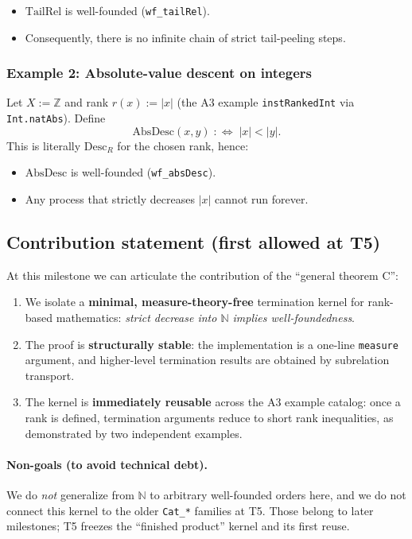 \begin{itemize}
\item $\mathrm{TailRel}$ is well-founded (\texttt{wf\_tailRel}).
\item Consequently, there is no infinite chain of strict tail-peeling steps.
\end{itemize}

\subsubsection{Example 2: Absolute-value descent on integers}
Let $X:=\mathbb{Z}$ and rank $r(x):=|x|$ (the A3 example \texttt{instRankedInt} via \texttt{Int.natAbs}).
Define
\[
  \mathrm{AbsDesc}(x,y) \;:\!\!\iff\; |x| < |y|.
\]
This is literally $\mathrm{Desc}_R$ for the chosen rank, hence:

\begin{itemize}
\item $\mathrm{AbsDesc}$ is well-founded (\texttt{wf\_absDesc}).
\item Any process that strictly decreases $|x|$ cannot run forever.
\end{itemize}

\subsection{Contribution statement (first allowed at T5)}
At this milestone we can articulate the contribution of the ``general theorem C'':

\begin{enumerate}
\item We isolate a \textbf{minimal, measure-theory-free} termination kernel for rank-based mathematics:
  \emph{strict decrease into $\mathbb{N}$ implies well-foundedness}.
\item The proof is \textbf{structurally stable}: the implementation is a one-line \texttt{measure} argument,
  and higher-level termination results are obtained by subrelation transport.
\item The kernel is \textbf{immediately reusable} across the A3 example catalog: once a rank is defined,
  termination arguments reduce to short rank inequalities, as demonstrated by two independent examples.
\end{enumerate}

\paragraph{Non-goals (to avoid technical debt).}
We do \emph{not} generalize from $\mathbb{N}$ to arbitrary well-founded orders here, and we do not connect
this kernel to the older \texttt{Cat\_*} families at T5. Those belong to later milestones; T5 freezes the
``finished product'' kernel and its first reuse.
